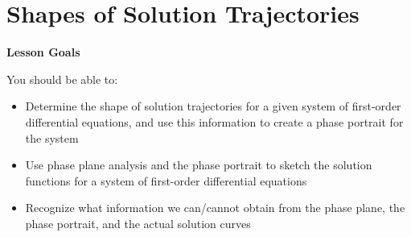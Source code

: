 \documentclass[main]{subfiles}
\begin{document}
\ifSubfilesClassLoaded{%
  \chaptermark{\chapterthree}
}{}

\section{Shapes of Solution Trajectories} \label{ws3-11}

\begin{framed}
\centerline{\textbf{Lesson Goals}}

You should be able to:
\begin{itemize}
\item Determine the shape of solution trajectories for a given system of first-order differential equations, and use this information to create a phase portrait for the system
\item Use phase plane analysis and the phase portrait to sketch the solution functions for a system of first-order differential equations
\item Recognize what information we can/cannot obtain from the phase plane, the phase portrait, and the actual solution curves
\end{itemize}
\end{framed}
\end{document}

